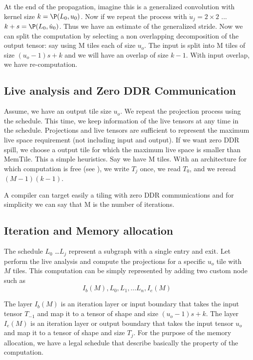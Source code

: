 \documentclass[conference]{IEEEtran}
\begin{document}
At the end of the propagation, imagine this is a generalized
convolution with kernel size $k = \P(L_0, u_0)$. Now if we repeat the
process with $\dot{u}_j = 2\times 2$ ... $k+s = \P(L_0,
\dot{u}_0)$. Thus we have an estimate of the generalized stride.  Now
we can split the computation by selecting a non overlapping
decomposition of the output tensor: say using M tiles each of size
$u_o$. The input is split into M tiles of size $(u_o-1)s+k$ and we
will have an overlap of size $k-1$. With input overlap, we have
re-computation. 

\subsection{Live analysis and Zero DDR Communication}
Assume, we have an output tile size $u_o$. We repeat the projection
process using the schedule. This time, we keep information of the live
tensors at any time in the schedule. Projections and live tensors are
sufficient to represent the maximum live space requirement (not
including input and output). If we want zero DDR spill, we choose a
output tile for which the maximum live space is smaller than
MemTile. This a simple heuristics. Say we have M tiles. With an
architecture for which computation is free (see
\cite{Hong1981IOCT,BilardiPD00}), we write $T_j$ once, we read $T_0$,
and we reread $(M-1)(k-1)$.

A compiler can target easily a tiling with zero DDR communications and
for simplicity we can say that M is the number of iterations.

\subsection{Iteration and Memory allocation}
The schedule $L_0$ \dots $L_j$ represent a subgraph with a single
entry and exit. Let perform the live analysis and compute the
projections for a specific $u_o$ tile with $M$ tiles. This computation
can be simply represented by adding two custom node such as
\[ I_b(M), L_0, L_1, ... L_n, I_e(M) \]

The layer $I_b(M)$ is an iteration layer or input boundary that takes
the input tensor $T_{-1}$ and map it to a tensor of shape and size
$(u_o-1)s+k$. The layer $I_e(M)$ is an iteration layer or output
boundary that takes the input tensor $u_o$ and map it to a tensor of
shape and size $T_j$. For the purpose of the memory allocation, we
have a legal schedule that describe basically the property of the
computation.
\end{document}
